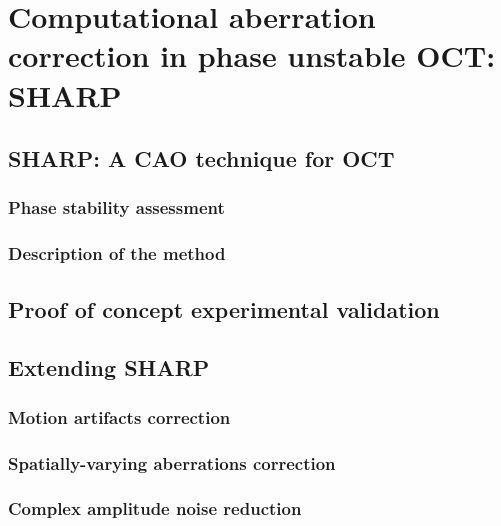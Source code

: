 \newpage
{}
\chapter[Computational aberration correction in phase unstable OCT: \\ SHARP]{Computational aberration correction in phase unstable OCT: SHARP}\label{chap:SHARP}

\section{SHARP: A CAO technique for OCT}

\subsection{Phase stability assessment}

\subsection{Description of the method}

\section{Proof of concept experimental validation}

\section{Extending SHARP}

\subsection{Motion artifacts correction}

\subsection{Spatially-varying aberrations correction}

\subsection{Complex amplitude noise reduction}